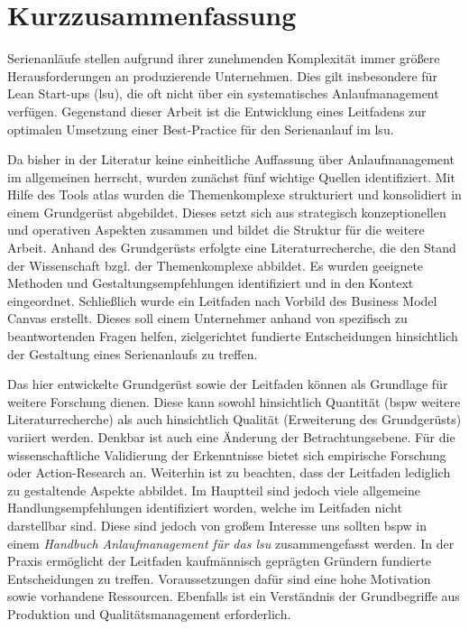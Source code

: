 \chapter*{Kurzzusammenfassung}
Serienanläufe stellen aufgrund ihrer zunehmenden Komplexität immer größere Herausforderungen an produzierende Unternehmen. Dies gilt insbesondere für Lean Start-ups (\gls{lsu}), die oft nicht über ein systematisches Anlaufmanagement verfügen.
Gegenstand dieser Arbeit ist die Entwicklung eines Leitfadens zur optimalen Umsetzung einer Best-Practice für den Serienanlauf im \gls{lsu}.

Da bisher in der Literatur keine einheitliche Auffassung über Anlaufmanagement im allgemeinen herrscht, wurden zunächst fünf wichtige Quellen identifiziert. Mit Hilfe des Tools \gls{atlas} wurden die Themenkomplexe strukturiert und konsolidiert in einem Grundgerüst abgebildet. Dieses setzt sich aus strategisch konzeptionellen und operativen Aspekten zusammen und bildet die Struktur für die weitere Arbeit. 
Anhand des Grundgerüsts erfolgte eine Literaturrecherche, die den Stand der Wissenschaft bzgl. der Themenkomplexe abbildet. Es wurden geeignete Methoden und Gestaltungsempfehlungen identifiziert und in den Kontext eingeordnet. 
Schließlich wurde ein Leitfaden nach Vorbild des Business Model Canvas erstellt. Dieses soll einem Unternehmer anhand von spezifisch zu beantwortenden Fragen helfen, zielgerichtet fundierte Entscheidungen hinsichtlich der Gestaltung eines Serienanlaufs zu treffen. 
% 

Das hier entwickelte Grundgerüst sowie der Leitfaden können als Grundlage für weitere Forschung dienen. Diese kann sowohl hinsichtlich Quantität (\gls{bspw} weitere Literaturrecherche) als auch hinsichtlich Qualität (Erweiterung des Grundgerüsts) variiert werden. Denkbar ist auch eine Änderung der Betrachtungsebene. Für die wissenschaftliche Validierung der Erkenntnisse bietet sich empirische Forschung oder Ac­tion-Re­search an. 
Weiterhin ist zu beachten, dass der Leitfaden lediglich zu gestaltende Aspekte abbildet. Im Hauptteil sind jedoch viele allgemeine Handlungsempfehlungen identifiziert worden, welche im Leitfaden nicht darstellbar sind. Diese sind jedoch von großem Interesse uns sollten \gls{bspw} in einem \textit{Handbuch Anlaufmanagement für das \gls{lsu}} zusammengefasst werden.
% 
In der Praxis ermöglicht der Leitfaden kaufmännisch geprägten Gründern fundierte Entscheidungen zu treffen. Voraussetzungen dafür sind eine hohe Motivation sowie vorhandene Ressourcen. Ebenfalls ist ein Verständnis der Grundbegriffe aus Produktion und Qualitätsmanagement erforderlich. 

